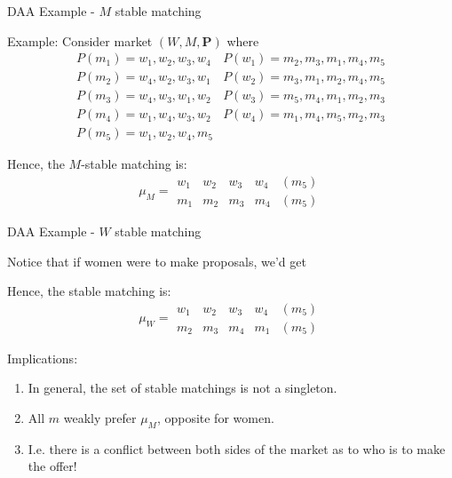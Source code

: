 \documentclass{beamer}%
\begin{document}
\begin{frame}{DAA Example - $M$ stable matching}
\begin{midi}
\item Example: Consider market $(W,M,\mathbf{P})$ where
\begin{equation*}
\begin{array}{cc}
P(m_1) = w_1,w_2,w_3,w_4 & P(w_1) = m_2,m_3,m_1,m_4,m_5 \\ 
P(m_2) = w_4,w_2,w_3,w_1 & P(w_2) = m_3,m_1,m_2,m_4,m_5 \\ 
P(m_3) = w_4,w_3,w_1,w_2 & P(w_3) = m_5,m_4,m_1,m_2,m_3 \\ 
P(m_4) = w_1,w_4,w_3,w_2 & P(w_4) = m_1,m_4,m_5,m_2,m_3 \\ 
P(m_5) = w_1,w_2,w_4,m_5 & 
\end{array}
\end{equation*}
\item Hence, the $M$-stable matching is:
\begin{equation*}
\mu_M = \begin{array}{ccccc}
w_1 & w_2 & w_3 & w_4 & (m_5) \\
m_1 & m_2 & m_3 & m_4 & (m_5) 
\end{array}
\end{equation*}
\end{midi}
\end{frame}

\begin{frame}{DAA Example - $W$ stable matching}
\begin{midi}
\item Notice that if women were to make proposals, we'd get
\item Hence, the stable matching is:
\begin{equation*}
\mu_W = \begin{array}{ccccc}
w_1 & w_2 & w_3 & w_4 & (m_5) \\
m_2 & m_3 & m_4 & m_1 & (m_5) 
\end{array}
\end{equation*}
\item Implications:
\begin{enumerate}
\item In general, the set of stable matchings is not a singleton.
\item All $m$ weakly prefer $\mu_M$, opposite for women.
\item I.e. there is a conflict between both sides of the market as to who is to make the offer!
\end{enumerate}
\end{midi}
\end{frame}
\end{document}
